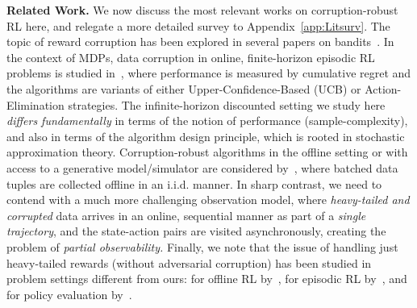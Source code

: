 \documentclass{article}
\begin{document}
\textbf{Related Work.} We now discuss the most relevant works on corruption-robust RL here, and relegate a more detailed survey to Appendix~\ref{app:Litsurv}. The topic of reward corruption has been explored in several papers on bandits~\cite{junadv, lykouris, liuadv, guptaadv, bogunovic, bogunovic1, garcelon, kapoor, he22, crimed}. In the context of MDPs, data corruption in online, finite-horizon episodic RL problems is studied in~\citet{lykourisRL, chen2021improved, wei2022model, ye2023episodic}, where performance is measured by cumulative regret and the algorithms are variants of either Upper-Confidence-Based (UCB) or Action-Elimination strategies. The infinite-horizon discounted setting we study here \emph{differs fundamentally} in terms of the notion of performance (sample-complexity), and also in terms of the algorithm design principle, which is rooted in stochastic approximation theory. Corruption-robust algorithms in the offline setting or with access to a generative model/simulator are considered by~\citet{zhang2022corruption, ye2023corruption, mandal2024corruption, maity2024robust}, where batched data tuples are collected offline in an i.i.d. manner. In sharp contrast, we need to contend with a much more challenging observation model, where \emph{heavy-tailed and corrupted} data arrives in an online, sequential manner as part of a \emph{single trajectory}, and the state-action pairs are visited asynchronously, creating the problem of \emph{partial observability.} Finally, we note that the issue of handling just heavy-tailed rewards (without adversarial corruption) has been studied in problem settings different from ours: for offline RL by~\citet{zhu2024hv}, for episodic RL by~\citet{zhuanghv}, and for policy evaluation by~\citet{cayci2024}. 
\end{document}
